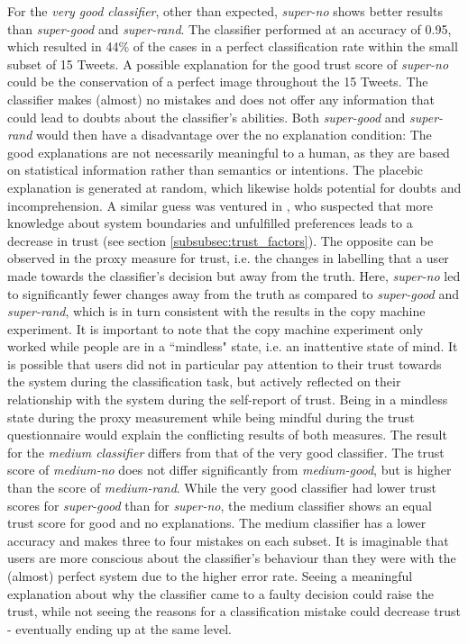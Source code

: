 For the \textit{very good classifier}, other than expected, \textit{super-no} shows better results than \textit{super-good} and \textit{super-rand}. The classifier performed at an accuracy of 0.95, which resulted in 44\% of the cases in a perfect classification rate within the small subset of 15 Tweets. A possible explanation for the good trust score of \textit{super-no} could be the conservation of a perfect image throughout the 15 Tweets. The classifier makes (almost) no mistakes and does not offer any information that could lead to doubts about the classifier's abilities. Both \textit{super-good} and \textit{super-rand} would then have a disadvantage over the no explanation condition: The good explanations are not necessarily meaningful to a human, as they are based on statistical information rather than semantics or intentions. The placebic explanation is generated at random, which likewise holds potential for doubts and incomprehension. A similar guess was ventured in \cite{cramer2008effects}, who suspected that more knowledge about system boundaries and unfulfilled preferences leads to a decrease in trust (see section \ref{subsubsec:trust_factors}). The opposite can be observed in the proxy measure for trust, i.e. the changes in labelling that a user made towards the classifier's decision but away from the truth. Here, \textit{super-no} led to significantly fewer changes away from the truth as compared to \textit{super-good} and \textit{super-rand}, which is in turn consistent with the results in the copy machine experiment. It is important to note that the copy machine experiment only worked while people are in a ``mindless" state, i.e. an inattentive state of mind. It is possible that users did not in particular pay attention to their trust towards the system during the classification task, but actively reflected on their relationship with the system during the self-report of trust. Being in a mindless state during the proxy measurement while being mindful during the trust questionnaire would explain the conflicting results of both measures.\newline
The result for the \textit{medium classifier} differs from that of the very good classifier. The trust score of \textit{medium-no} does not differ significantly from \textit{medium-good}, but is higher than the score of \textit{medium-rand}. While the very good classifier had lower trust scores for \textit{super-good} than for \textit{super-no}, the medium classifier shows an equal trust score for good and no explanations. The medium classifier has a lower accuracy and makes three to four mistakes on each subset. It is imaginable that users are more conscious about the classifier's behaviour than they were with the (almost) perfect system due to the higher error rate. Seeing a meaningful explanation about why the classifier came to a faulty decision could raise the trust, while not seeing the reasons for a classification mistake could decrease trust - eventually ending up at the same level.\newline

